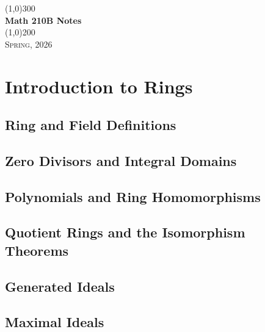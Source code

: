 \documentclass[a4paper, openany]{book}
\begin{document}
\begin{titlepage}
    \begin{center}
        \line(1,0){300} \\
        [0.25in]
        \huge{\bfseries Math 210B Notes} \\
        [2mm]
        \line(1,0){200} \\
        [1.5cm]
        \textsc{\LARGE Spring, 2026}
    \end{center}
\end{titlepage}

\tableofcontents
\setcounter{section}{0}

\chapter{Introduction to Rings}
\section{Ring and Field Definitions}

\newpage

\section{Zero Divisors and Integral Domains}

\newpage

\section{Polynomials and Ring Homomorphisms}

\newpage

\section{Quotient Rings and the Isomorphism Theorems}

\newpage

\section{Generated Ideals}

\newpage

\section{Maximal Ideals}

\newpage
\end{document}
